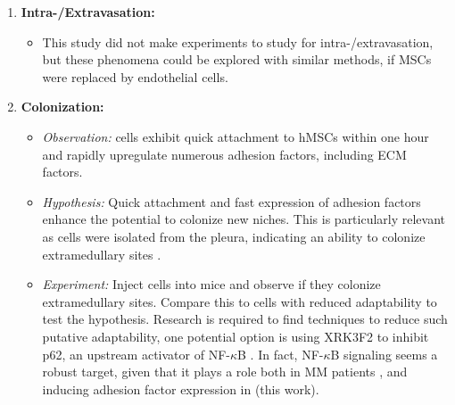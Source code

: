 \begin{enumerate}
\begin{itemize}
            \end{itemize}
      \item \textbf{Intra-/Extravasation:}
            \begin{itemize}
                  \item This study did not make experiments to study for
                        intra-/extravasation, but these phenomena could be
                        explored with similar methods, if MSCs were replaced by
                        endothelial cells.
            \end{itemize}
      \item \textbf{Colonization:}
            \begin{itemize}
                  \item \textit{Observation:} \INA cells exhibit quick
                        attachment to \acp{hMSC} within one hour and rapidly
                        upregulate numerous adhesion factors, including \ac{ECM}
                        factors.
                  \item \textit{Hypothesis:} Quick attachment and fast
                        expression of adhesion factors enhance the potential to
                        colonize new niches. This is particularly relevant as \INA
                        cells were isolated from the pleura, indicating an ability to
                        colonize extramedullary sites
                        \cite{burgerGp130RasMediated2001c}.
                  \item \textit{Experiment:} Inject \INA cells into mice and
                        observe if they colonize extramedullary sites. Compare
                        this to \INA cells with reduced adaptability to test the
                        hypothesis. Research is required to find techniques to
                        reduce such putative adaptability, one potential option
                        is using XRK3F2 to inhibit p62, an upstream activator of
                        NF-$\kappa$B \cite{adamikXRK3F2InhibitionP62ZZ2018}. In
                        fact, NF-$\kappa$B signaling seems a robust target,
                        given that it plays a role both in MM patients
                        \cite{sarinEvaluatingEfficacyMultiple2020}, and inducing
                        adhesion factor expression in \INA (this work).

            \end{itemize}
\end{enumerate}


